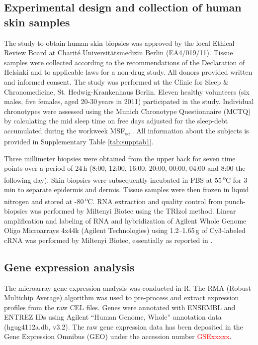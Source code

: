 \subsection*{Experimental design and collection of human skin samples}%
The study to obtain human skin biopsies was approved by the local Ethical Review Board at Charit\'e Universit\"atsmedizin Berlin (EA4/019/11). Tissue samples were collected according to the recommendations of the Declaration of Helsinki and to applicable laws for a non-drug study. All donors provided written and informed consent. The study was performed at the Clinic for Sleep \& Chronomedicine, St. Hedwig-Krankenhaus Berlin. Eleven healthy volunteers (six males, five females, aged 20-30\,years in 2011) participated in the study. Individual chronotypes were assessed using the Munich Chronotype Questionnaire (MCTQ) by calculating the mid sleep time on free days adjusted for the sleep-debt accumulated during the workweek MSF\textsubscript{sc} \cite{Vetter2021}. All information about the subjects is provided in Supplementary Table \ref{tab:supptab1}. %

Three millimeter biopsies were obtained from the upper back for seven time points over a period of 24\,h (8:00, 12:00, 16:00, 20:00, 00:00, 04:00 and 8:00 the following day). Skin biopsies were subsequently incubated in PBS at 55\,\textsuperscript{o}C for 3\,min to separate epidermis and dermis. Tissue samples were then frozen in liquid nitrogen and stored at -80\,\textsuperscript{o}C. RNA extraction and quality control from punch-biopsies was performed by Miltenyi Biotec using the TRIzol method. Linear amplification and labeling of RNA and hybridization of Agilent Whole Genome Oligo Microarrays 4x44k (Agilent Technologies) using 1.2--1.65\,\textmu g of Cy3-labeled cRNA was performed by Miltenyi Biotec, essentially as reported in \cite{Duggan1999}.  %

\subsection*{Gene expression analysis}
The microarray gene expression analysis was conducted in R. The RMA (Robust Multichip Average) algorithm was used to pre-process and extract expression profiles from the raw CEL files. Genes were annotated with ENSEMBL and ENTREZ IDs using Agilent ``Human Genome, Whole'' annotation data (hgug4112a.db, v3.2). The raw gene expression data has been deposited in the Gene Expression Omnibus (GEO) under the accession number \textcolor{red}{GSExxxxx}. 

